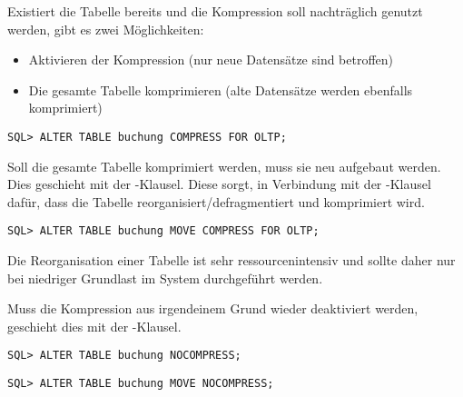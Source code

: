           Existiert die Tabelle bereits und die Kompression soll nachträglich genutzt werden, gibt es zwei Möglichkeiten:
          \begin{itemize}
            \item Aktivieren der Kompression (nur neue Datensätze sind betroffen)
            \item Die gesamte Tabelle komprimieren (alte Datensätze werden ebenfalls komprimiert)
          \end{itemize}
          \begin{lstlisting}[caption={Nachträgliches aktivieren der OLTP Kompression},label=admin303,language=oracle_sql]
SQL> ALTER TABLE buchung COMPRESS FOR OLTP;
          \end{lstlisting}
          Soll die gesamte Tabelle komprimiert werden, muss sie neu aufgebaut werden. Dies geschieht mit der -Klausel. Diese sorgt, in Verbindung mit der -Klausel dafür, dass die Tabelle reorganisiert/defragmentiert und komprimiert wird.
          \begin{lstlisting}[caption={Komprimieren einer Tabelle},label=admin304,language=oracle_sql]
SQL> ALTER TABLE buchung MOVE COMPRESS FOR OLTP;
          \end{lstlisting}
          \begin{merke}
            Die Reorganisation einer Tabelle ist sehr ressourcenintensiv und sollte daher nur bei niedriger Grundlast im System durchgeführt werden.
          \end{merke}
          Muss die Kompression aus irgendeinem Grund wieder deaktiviert werden, geschieht dies mit der -Klausel.
          \begin{lstlisting}[caption={Deaktivieren der Kompression},label=admin305,language=oracle_sql]
SQL> ALTER TABLE buchung NOCOMPRESS;
          \end{lstlisting}
          \begin{lstlisting}[caption={Dekomprimieren einer Tabelle},label=admin306,language=oracle_sql]
SQL> ALTER TABLE buchung MOVE NOCOMPRESS;
          \end{lstlisting}
\clearpage		  
